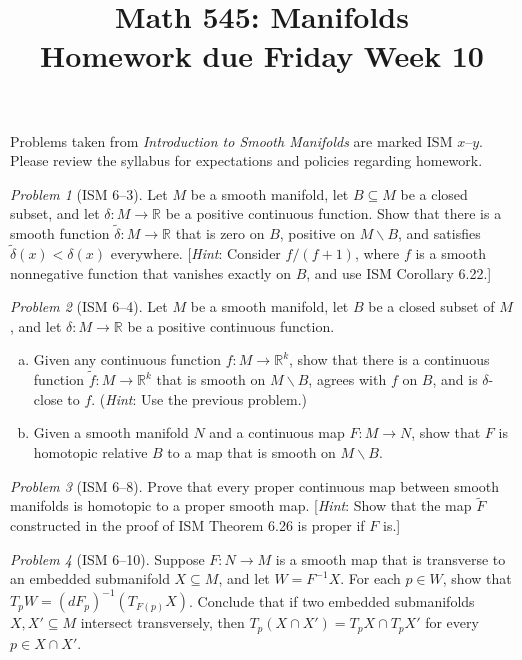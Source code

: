 \documentclass[11pt,twoside]{amsart}
\title{Math 545: Manifolds\\ Homework due Friday Week 10}
\theoremstyle{plain}
\theoremstyle{remark}
\newtheorem{prob}{Problem}
\theoremstyle{definition}
\theoremstyle{definition}
\newcommand{\RR}{\mathbb{R}}
\begin{document}
\maketitle

\noindent Problems taken from \emph{Introduction to Smooth Manifolds} are marked ISM $x$--$y$. Please review the syllabus for expectations and policies regarding homework.

\begin{prob}[ISM 6--3]
Let $M$ be a smooth manifold, let $B\subseteq M$ be a closed subset, and let $\delta\colon M\to \RR$ be a positive continuous function. Show that there is a smooth function $\tilde\delta\colon M\to \RR$ that is zero on $B$, positive on $M\smallsetminus B$, and satisfies $\tilde\delta(x)<\delta(x)$ everywhere. [\emph{Hint}: Consider $f/(f+1)$, where $f$ is a smooth nonnegative function that vanishes exactly on $B$, and use ISM Corollary 6.22.]
\end{prob}

\begin{prob}[ISM 6--4]
Let $M$ be a smooth manifold, let $B$ be a closed subset of $M$, and let $\delta\colon M\to \RR$ be a positive continuous function.
\begin{enumerate}[(a)]
\item Given any continuous function $f\colon M\to \RR^k$, show that there is a continuous function $\tilde f\colon M\to \RR^k$ that is smooth on $M\smallsetminus B$, agrees with $f$ on $B$, and is $\delta$-close to $f$. (\emph{Hint}: Use the previous problem.)
\item Given a smooth manifold $N$ and a continuous map $F\colon M\to N$, show that $F$ is homotopic relative $B$ to a map that is smooth on $M\smallsetminus B$.
\end{enumerate}
\end{prob}

\begin{prob}[ISM 6--8]
Prove that every proper continuous map between smooth manifolds is homotopic to a proper smooth map. [\emph{Hint}: Show that the map $\tilde F$ constructed in the proof of ISM Theorem 6.26 is proper if $F$ is.]
\end{prob}

\begin{prob}[ISM 6--10]
Suppose $F\colon N\to M$ is a smooth map that is transverse to an embedded submanifold $X\subseteq M$, and let $W = F^{-1}X$. For each $p\in W$, show that $T_pW = (dF_p)^{-1}(T_{F(p)}X)$. Conclude that if two embedded submanifolds $X,X'\subseteq M$ intersect transversely, then $T_p(X\cap X') = T_pX\cap T_pX'$ for every $p\in X\cap X'$.
\end{prob}
\end{document}

